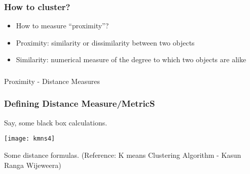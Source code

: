 \begin{frame}[fragile]\frametitle{How to cluster?}
\begin{itemize}
\item How to measure ``proximity''?
\item Proximity: similarity or dissimilarity between two objects
\item Similarity: numerical measure of the degree to which two objects are alike

\end{itemize}

\end{frame}


\begin{frame}[fragile]\frametitle{}
\begin{center}
{\Large Proximity - Distance Measures}
\end{center}
\end{frame}

\begin{frame}[fragile]\frametitle{Defining Distance Measure/MetricS}
Say, some black box calculations.
\begin{center}
\texttt{[image: kmns4]}
\end{center}
Some distance formulas.
\tiny{(Reference: K means Clustering Algorithm - 
Kasun Ranga Wijeweera)}
\end{frame}

%

